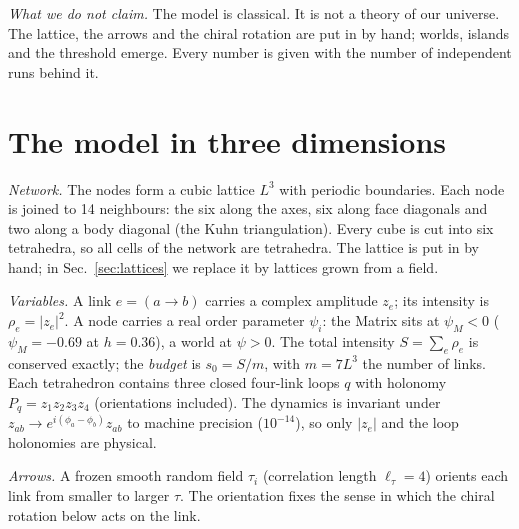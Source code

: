 \documentclass[reprint,pre,amsmath,amssymb,superscriptaddress,nofootinbib]{revtex4-2}
\newcommand{\sz}{s_0}
\begin{document}
\emph{What we do not claim.} The model is classical. It is not a theory of our universe. The lattice, the arrows and the chiral rotation are put in by hand; worlds, islands and the threshold emerge. Every number is given with the number of independent runs behind it.

\section{The model in three dimensions}\label{sec:model}

\emph{Network.} The nodes form a cubic lattice $L^3$ with periodic boundaries. Each node is joined to 14 neighbours: the six along the axes, six along face diagonals and two along a body diagonal (the Kuhn triangulation). Every cube is cut into six tetrahedra, so all cells of the network are tetrahedra. The lattice is put in by hand; in Sec.~\ref{sec:lattices} we replace it by lattices grown from a field.

\emph{Variables.} A link $e=(a\to b)$ carries a complex amplitude $z_e$; its intensity is $\rho_e=|z_e|^2$. A node carries a real order parameter $\psi_i$: the Matrix sits at $\psi_M<0$ ($\psi_M=-0.69$ at $h=0.36$), a world at $\psi>0$. The total intensity $S=\sum_e\rho_e$ is conserved exactly; the \emph{budget} is $\sz=S/m$, with $m=7L^3$ the number of links. Each tetrahedron contains three closed four-link loops $q$ with holonomy $P_q=z_1z_2z_3z_4$ (orientations included). The dynamics is invariant under $z_{ab}\to e^{i(\phi_a-\phi_b)}z_{ab}$ to machine precision ($10^{-14}$), so only $|z_e|$ and the loop holonomies are physical.

\emph{Arrows.} A frozen smooth random field $\tau_i$ (correlation length $\ell_\tau=4$) orients each link from smaller to larger $\tau$. The orientation fixes the sense in which the chiral rotation below acts on the link.
\end{document}
